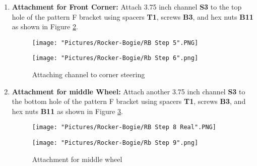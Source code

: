 \documentclass[12pt]{article}
\begin{document}
\begin{enumerate}
\begin{figure}[H]
  \centering
  \begin{minipage}[b]{0.45\textwidth}
    \texttt{[image: "Pictures/Rocker-Bogie/RB Step 3".PNG]}
  \end{minipage}
  \hfill
  \begin{minipage}[b]{0.45\textwidth}
    \texttt{[image: "Pictures/Rocker-Bogie/RB Step 4".PNG]}
  \end{minipage}
  \caption{Start Rocker-Bogie pivot joint}
  \label{RB2}
\end{figure}




\item \textbf{Attachment for Front Corner:} Attach 3.75 inch channel \textbf{S3} to the top hole of the pattern F bracket using spacers \textbf{T1}, screws \textbf{B3}, and hex nuts \textbf{B11} as shown in Figure \ref{attaching channel corner}. 

\begin{figure}[H]
  \centering
  \begin{minipage}[b]{0.45\textwidth}
    \texttt{[image: "Pictures/Rocker-Bogie/RB Step 5".PNG]}
  \end{minipage}
  \hfill
  \begin{minipage}[b]{0.45\textwidth}
    \texttt{[image: "Pictures/Rocker-Bogie/Rb Step 6".png]}
  \end{minipage}
  \caption{Attaching channel to corner steering}
  \label{attaching channel corner}
\end{figure}


\item \textbf{Attachment for middle Wheel:} Attach another 3.75 inch channel \textbf{S3} to the bottom hole of the pattern F bracket using spacers \textbf{T1}, screws \textbf{B3}, and hex nuts \textbf{B11} as shown in Figure \ref{attaching middle wheel}. 

\begin{figure}[H]
  \centering
  \begin{minipage}[b]{0.45\textwidth}
    \texttt{[image: "Pictures/Rocker-Bogie/RB Step 8 Real".PNG]}
  \end{minipage}
  \hfill
  \begin{minipage}[b]{0.45\textwidth}
    \texttt{[image: "Pictures/Rocker-Bogie/Rb Step 9".png]}
  \end{minipage}
  \caption{Attachment for middle wheel}
  \label{attaching middle wheel}
\end{figure}
 


\end{enumerate}
\end{document}
